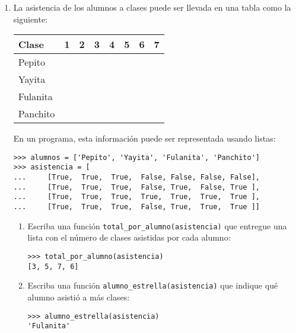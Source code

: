 \documentclass[11pt,spanish]{article}
\newcommand{\T}{\ding{51}}
\newcommand{\F}{}
\begin{document}
\begin{enumerate}
    \newpage
    \item
      La asistencia de los alumnos a clases
      puede ser llevada en una tabla como la siguiente:

      \begin{tabular}{|l|c|c|c|c|c|c|c|}\hline
        Clase    & 1& 2& 3& 4& 5& 6& 7\\\hline\hline
        Pepito   &\T&\T&\T&\F&\F&\F&\F\\\hline
        Yayita   &\T&\T&\T&\F&\T&\F&\T\\\hline
        Fulanita &\T&\T&\T&\T&\T&\T&\T\\\hline
        Panchito &\T&\T&\T&\F&\T&\T&\T\\\hline
      \end{tabular}

      En un programa,
      esta información puede ser representada usando listas:
      \begin{lstlisting}
>>> alumnos = ['Pepito', 'Yayita', 'Fulanita', 'Panchito']
>>> asistencia = [
...     [True,  True,  True,  False, False, False, False],
...     [True,  True,  True,  False, True,  False, True ],
...     [True,  True,  True,  True,  True,  True,  True ],
...     [True,  True,  True,  False, True,  True,  True ]]
      \end{lstlisting}

      \begin{enumerate}
        \item
          Escriba una función \lstinline+total_por_alumno(asistencia)+
          que entregue una lista
          con el número de clases asistidas por cada alumno:
          \begin{lstlisting}
>>> total_por_alumno(asistencia)
[3, 5, 7, 6]
          \end{lstlisting}
        \item
          Escriba una función \lstinline+alumno_estrella(asistencia)+
          que indique qué alumno asistió a más clases:
          \begin{lstlisting}
>>> alumno_estrella(asistencia)
'Fulanita'
          \end{lstlisting}
      \end{enumerate}
      \framebox[\textwidth]{\rule[50.0ex]{0pt}{0pt}}

  \end{enumerate}
\end{document}
